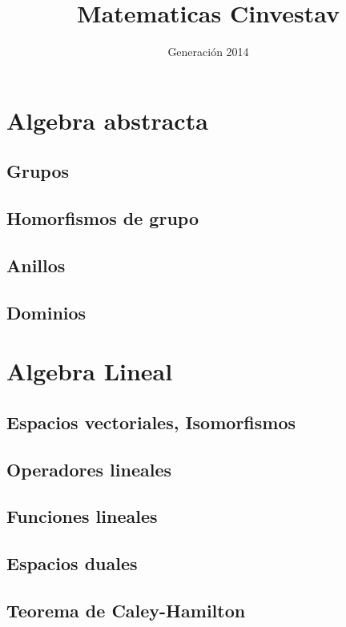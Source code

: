 \documentclass{tufte-book}
\title{Matematicas Cinvestav}
\author{Generación 2014}
\numberwithin{equation}{chapter}
\begin{document}
  \maketitle
  \tableofcontents
  \part{Algebra abstracta}
    \chapter{Grupos}
      
      
      
      
    \chapter{Homorfismos de grupo}
      
    \chapter{Anillos}
    \chapter{Dominios}
  \part{Algebra Lineal}
    \chapter{Espacios vectoriales, Isomorfismos}
    \chapter{Operadores lineales}
    \chapter{Funciones lineales}
    \chapter{Espacios duales}
    \chapter{Teorema de Caley-Hamilton}
\end{document}
